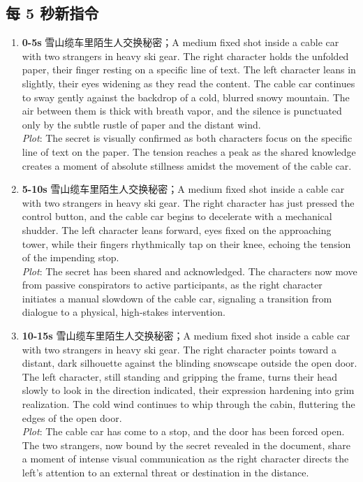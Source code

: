 \documentclass[11pt,a4paper]{article}
\begin{document}
\subsection*{每 5 秒新指令}
\begin{enumerate}
\item \textbf{0-5s} 雪山缆车里陌生人交换秘密；A medium fixed shot inside a cable car with two strangers in heavy ski gear. The right character holds the unfolded paper, their finger resting on a specific line of text. The left character leans in slightly, their eyes widening as they read the content. The cable car continues to sway gently against the backdrop of a cold, blurred snowy mountain. The air between them is thick with breath vapor, and the silence is punctuated only by the subtle rustle of paper and the distant wind.\\\newline \textit{Plot}: The secret is visually confirmed as both characters focus on the specific line of text on the paper. The tension reaches a peak as the shared knowledge creates a moment of absolute stillness amidst the movement of the cable car.
\item \textbf{5-10s} 雪山缆车里陌生人交换秘密；A medium fixed shot inside a cable car with two strangers in heavy ski gear. The right character has just pressed the control button, and the cable car begins to decelerate with a mechanical shudder. The left character leans forward, eyes fixed on the approaching tower, while their fingers rhythmically tap on their knee, echoing the tension of the impending stop.\\\newline \textit{Plot}: The secret has been shared and acknowledged. The characters now move from passive conspirators to active participants, as the right character initiates a manual slowdown of the cable car, signaling a transition from dialogue to a physical, high-stakes intervention.
\item \textbf{10-15s} 雪山缆车里陌生人交换秘密；A medium fixed shot inside a cable car with two strangers in heavy ski gear. The right character points toward a distant, dark silhouette against the blinding snowscape outside the open door. The left character, still standing and gripping the frame, turns their head slowly to look in the direction indicated, their expression hardening into grim realization. The cold wind continues to whip through the cabin, fluttering the edges of the open door.\\\newline \textit{Plot}: The cable car has come to a stop, and the door has been forced open. The two strangers, now bound by the secret revealed in the document, share a moment of intense visual communication as the right character directs the left's attention to an external threat or destination in the distance.

\end{enumerate}
\end{document}
